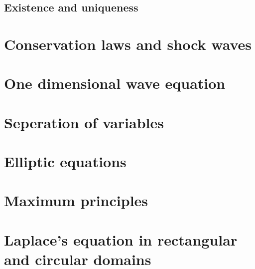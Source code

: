\subsection{Existence and uniqueness}

\section{Conservation laws and shock waves}

\section{One dimensional wave equation}

\section{Seperation of variables}

\section{Elliptic equations}

\section{Maximum principles}

\section{Laplace's equation in rectangular and circular domains}

